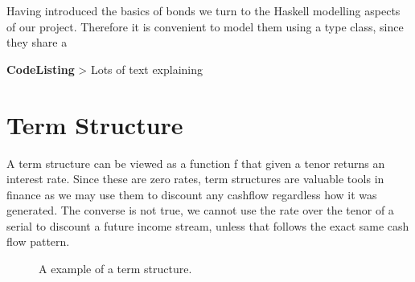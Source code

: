 Having introduced the basics of bonds we turn to the Haskell modelling aspects 
of our project. Therefore it is convenient to model them using a type class, since they share a 

\textbf{CodeListing}
> Lots of text explaining

\section{Term Structure}

A term structure can be viewed as a function f that given a tenor returns 
an interest rate. Since these are zero rates, term structures are valuable 
tools in finance as we may use them to discount any cashflow regardless how it
was generated. The converse is not true, we cannot use the rate over the tenor
of a serial to discount a future income stream, unless that follows the exact
same cash flow pattern.\\

\begin{figure}[h!]
\begin{center}
\caption{A example of a term structure.}
\label{fig:anc}
\end{center}
\end{figure}

